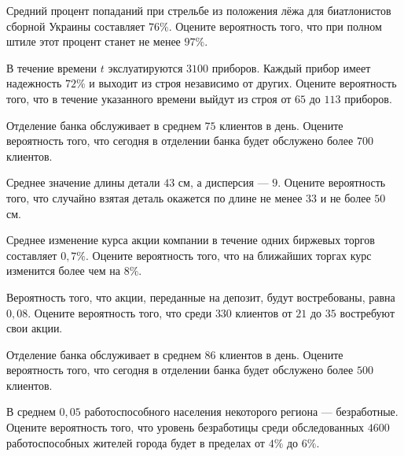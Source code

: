 \newpage\setcounter{zad}{0}

\z Средний процент попаданий при стрельбе из положения лёжа для биатлонистов сборной Украины составляет $ 76 \% $. Оцените вероятность того, что при полном штиле этот процент станет не менее $ 97 \% $.


\vfill

\z В течение времени $t$ экслуатируются $ 3100 $ приборов. Каждый прибор имеет надежность $ 72 \% $ и выходит из строя независимо от других. Оцените вероятность того, что в течение указанного времени выйдут из строя от $ 65 $ до $ 113 $ приборов.
 

\vfill

\newpage\setcounter{zad}{0}

\z Отделение банка обслуживает в среднем $ 75 $ клиентов в день. Оцените вероятность того, что сегодня в отделении банка будет обслужено более $ 700 $ клиентов.


\vfill

\z Среднее значение длины детали $ 43 $ см, а дисперсия --- $ 9 $. Оцените вероятность того, что случайно взятая деталь окажется по длине не менее $ 33 $ и не более $ 50 $ см.
 

\vfill

\newpage\setcounter{zad}{0}

\z Среднее изменение курса акции компании в течение одних биржевых торгов составляет $ 0{,}7 \% $. Оцените вероятность того, что на ближайших торгах курс изменится более чем на $ 8 \% $.


\vfill

\z Вероятность того, что акции, переданные на депозит, будут востребованы, равна $ 0{,}08 $. Оцените вероятность того, что среди $ 330 $ клиентов от $ 21 $ до $ 35 $ востребуют свои акции.
 

\vfill

\newpage\setcounter{zad}{0}

\z Отделение банка обслуживает в среднем $ 86 $ клиентов в день. Оцените вероятность того, что сегодня в отделении банка будет обслужено более $ 500 $ клиентов.


\vfill

\z В среднем $ 0{,}05 $ работоспособного населения некоторого региона --- безработные. Оцените вероятность того, что уровень безработицы среди обследованных $ 4600 $ работоспособных жителей города будет в пределах от $ 4 \%$ до $ 6 \%$.
 

\vfill

\newpage\setcounter{zad}{0}

